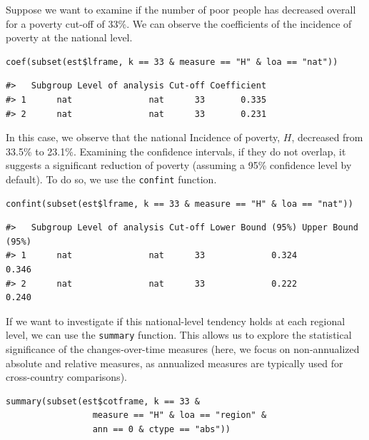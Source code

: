Suppose we want to examine if the number of poor people has decreased overall for a poverty cut-off of 33\%. We can observe the coefficients of the incidence of poverty at the national level.

\begin{verbatim}
coef(subset(est$lframe, k == 33 & measure == "H" & loa == "nat"))
\end{verbatim}

\begin{verbatim}
#>   Subgroup Level of analysis Cut-off Coefficient
#> 1      nat               nat      33       0.335
#> 2      nat               nat      33       0.231
\end{verbatim}

In this case, we observe that the national Incidence of poverty, \(H\), decreased from 33.5\% to 23.1\%. Examining the confidence intervals, if they do not overlap, it suggests a significant reduction of poverty (assuming a 95\% confidence level by default). To do so, we use the \texttt{confint} function.

\begin{verbatim}
confint(subset(est$lframe, k == 33 & measure == "H" & loa == "nat"))
\end{verbatim}

\begin{verbatim}
#>   Subgroup Level of analysis Cut-off Lower Bound (95%) Upper Bound (95%)
#> 1      nat               nat      33             0.324             0.346
#> 2      nat               nat      33             0.222             0.240
\end{verbatim}

If we want to investigate if this national-level tendency holds at each regional level, we can use the \texttt{summary} function. This allows us to explore the statistical significance of the changes-over-time measures (here, we focus on non-annualized absolute and relative measures, as annualized measures are typically used for cross-country comparisons).

\begin{verbatim}
summary(subset(est$cotframe, k == 33 & 
                 measure == "H" & loa == "region" & 
                 ann == 0 & ctype == "abs"))
\end{verbatim}


